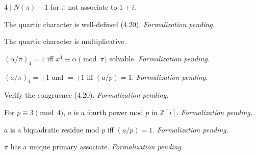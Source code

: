 \begin{theorem}[Exercise 4.17]
  \label{exr:s4_17}
  \leanok
  $4 \mid N(\pi) - 1$ for $\pi$ not associate to $1+i$.
\end{theorem}

\begin{theorem}[Exercise 4.18(a)]
  \label{exr:s4_18_a}
  \notready
  The quartic character is well-defined (4.20). \emph{Formalization pending.}
\end{theorem}

\begin{theorem}[Exercise 4.18(b)]
  \label{exr:s4_18_b}
  \leanok
  The quartic character is multiplicative.
\end{theorem}

\begin{theorem}[Exercise 4.18(c)]
  \label{exr:s4_18_c}
  \notready
  $(\alpha/\pi)_4 = 1$ iff $x^4 \equiv \alpha \pmod \pi$ solvable. \emph{Formalization pending.}
\end{theorem}

\begin{theorem}[Exercise 4.19(a)]
  \label{exr:s4_19_a}
  \notready
  $(a/\pi)_4 = \pm1$ and $= \pm1$ iff $(a/p) = 1$. \emph{Formalization pending.}
\end{theorem}

\begin{theorem}[Exercise 4.19(b)]
  \label{exr:s4_19_b}
  \notready
  Verify the congruence (4.20). \emph{Formalization pending.}
\end{theorem}

\begin{theorem}[Exercise 4.20(a)]
  \label{exr:s4_20_a}
  \notready
  For $p \equiv 3 \pmod 4$, $a$ is a fourth power mod $p$ in $\mathbb Z[i]$.
  \emph{Formalization pending.}
\end{theorem}

\begin{theorem}[Exercise 4.20(b)]
  \label{exr:s4_20_b}
  \notready
  $a$ is a biquadratic residue mod $p$ iff $(a/p) = 1$. \emph{Formalization pending.}
\end{theorem}

\begin{theorem}[Exercise 4.21]
  \label{exr:s4_21}
  \notready
  $\pi$ has a unique primary associate. \emph{Formalization pending.}
\end{theorem}

